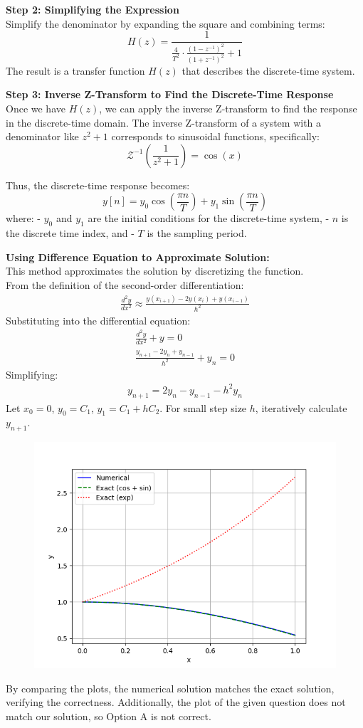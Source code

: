 \documentclass[journal]{IEEEtran}
\begin{document}
\textbf{Step 2: Simplifying the Expression}\\
Simplify the denominator by expanding the square and combining terms:
\[
H(z) = \frac{1}{\frac{4}{T^2} \cdot \frac{(1 - z^{-1})^2}{(1 + z^{-1})^2} + 1}
\]
The result is a transfer function \( H(z) \) that describes the discrete-time system.

\textbf{Step 3: Inverse Z-Transform to Find the Discrete-Time Response}\\
Once we have \( H(z) \), we can apply the inverse Z-transform to find the response in the discrete-time domain. The inverse Z-transform of a system with a denominator like \( z^2 + 1 \) corresponds to sinusoidal functions, specifically:
\[
\mathcal{Z}^{-1}\left( \frac{1}{z^2 + 1} \right) = \cos(x)
\]

Thus, the discrete-time response becomes:
\[
y[n] = y_0 \cos\left( \frac{\pi n}{T} \right) + y_1 \sin\left( \frac{\pi n}{T} \right)
\]
where:
- \( y_0 \) and \( y_1 \) are the initial conditions for the discrete-time system, 
- \( n \) is the discrete time index, and 
- \( T \) is the sampling period.



\textbf{Using Difference Equation to Approximate Solution:}\\
This method approximates the solution by discretizing the function.\\
From the definition of the second-order differentiation:
\begin{align}
	\frac{d^2y}{dx^2} \approx \frac{y(x_{i+1}) - 2y(x_i) + y(x_{i-1})}{h^2}
\end{align}
Substituting into the differential equation:
\begin{align}
	\frac{d^2y}{dx^2} + y = 0 \\
	\frac{y_{n+1} - 2y_n + y_{n-1}}{h^2} + y_n = 0
\end{align}
Simplifying:
\begin{align}
	y_{n+1} = 2y_n - y_{n-1} - h^2y_n
\end{align}
Let \( x_0 = 0 \), \( y_0 = C_1 \), \( y_1 = C_1 + hC_2 \). For small step size \( h \), iteratively calculate \( y_{n+1} \).\\

\begin{figure}[h]
	\centering
	\includegraphics[width=\textwidth]{figs/fig.png}
\end{figure}

By comparing the plots, the numerical solution matches the exact solution, verifying the correctness. Additionally, the plot of the given question does not match our solution, so Option A is not correct.
\end{document}
